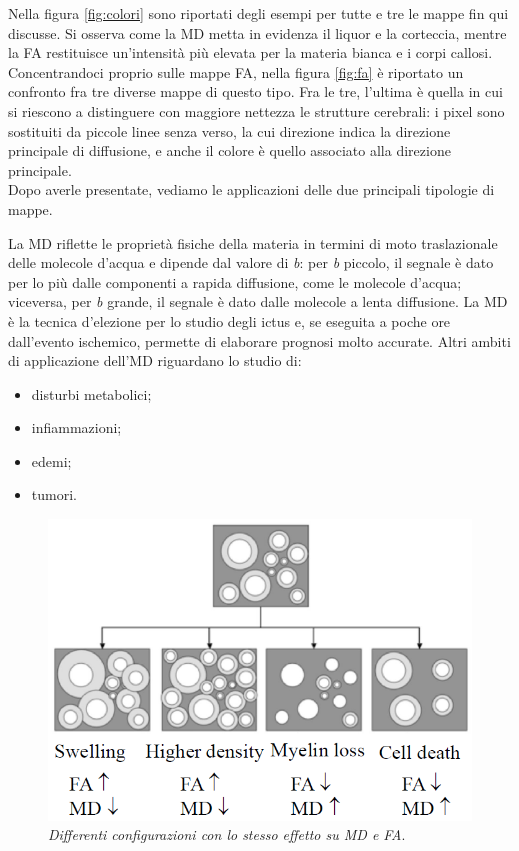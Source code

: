 \documentclass{report}
\newcommand{\figref}[1]{figura \ref{#1}}
\numberwithin{equation}{section}
\numberwithin{figure}{section}
\begin{document}
\noindent Nella \figref{fig:colori} sono riportati degli esempi per tutte e tre le mappe fin qui discusse. Si osserva come la MD metta in evidenza il liquor e la corteccia, mentre la FA restituisce un'intensità più elevata per la materia bianca e i corpi callosi. Concentrandoci proprio sulle mappe FA, nella \figref{fig:fa} è riportato un confronto fra tre diverse mappe di questo tipo. Fra le tre, l'ultima è quella in cui si riescono a distinguere con maggiore nettezza le strutture cerebrali: i pixel sono sostituiti da piccole linee senza verso, la cui direzione indica la direzione principale di diffusione, e anche il colore è quello associato alla direzione principale.\\
Dopo averle presentate, vediamo le applicazioni delle due principali tipologie di mappe.

La MD riflette le proprietà fisiche della materia in termini di moto traslazionale delle molecole d'acqua e dipende dal valore di \textit{b}: per \textit{b} piccolo, il segnale è dato per lo più dalle componenti a rapida diffusione, come le molecole d'acqua; viceversa, per \textit{b} grande, il segnale è dato dalle molecole a lenta diffusione. La MD è la tecnica d'elezione per lo studio degli ictus e, se eseguita a poche ore dall'evento ischemico, permette di elaborare prognosi molto accurate. Altri ambiti di applicazione dell'MD riguardano lo studio di:
\begin{itemize}[label=$-$]
    \item disturbi metabolici;
    \item infiammazioni;
    \item edemi;
    \item tumori.
\end{itemize}

\begin{figure}[H]
\centering
\includegraphics[scale=0.72]{immagini/famd.png}
\caption{\label{fig:famd} \textit{Differenti configurazioni con lo stesso effetto su MD e FA}.}
\end{figure}
\end{document}
